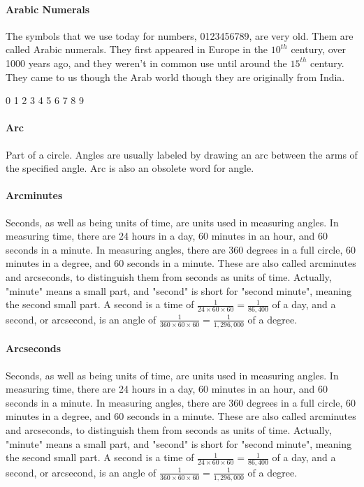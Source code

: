 \documentclass[12pt]{article}
\begin{document}
\paragraph{Arabic Numerals}
The symbols that we use today for numbers, 0123456789, are very old. Them are called Arabic numerals. They first appeared in Europe in the $10^{th}$ century, over 1000 years ago, and they weren't in common use until around the $15^{th}$ century. They came to us though the Arab world though they are originally from India.
\begin{center}
{\Huge 0 1 2 3 4 5 6 7 8 9}
\end{center}

\paragraph{Arc} Part of a circle. Angles are usually labeled by drawing an arc between the arms of the specified angle. Arc is also an obsolete word for angle.

\begin{center}
\end{center}

\paragraph{Arcminutes}
Seconds, as well as being units of time, are units used in  measuring angles. In measuring time, there are 24 hours in a day, 60 minutes in an hour, and 60 seconds in a minute. In measuring angles, there are 360 degrees in a full circle, 60 minutes in a degree, and 60 seconds in a minute. These are also called arcminutes and arcseconds, to distinguish them from seconds as units of time. Actually, "minute" means a small part, and "second" is short for "second minute", meaning the second small part. A second is a time of $\frac{1}{24\times60\times60} = \frac{1}{86,400}$ of a day, and a second, or arcsecond, is an angle of $\frac{1}{360\times60\times60}=\frac{1}{1,296,000}$ of a degree.

\paragraph{Arcseconds}
Seconds, as well as being units of time, are units used in  measuring angles. In measuring time, there are 24 hours in a day, 60 minutes in an hour, and 60 seconds in a minute. In measuring angles, there are 360 degrees in a full circle, 60 minutes in a degree, and 60 seconds in a minute. These are also called arcminutes and arcseconds, to distinguish them from seconds as units of time. Actually, "minute" means a small part, and "second" is short for "second minute", meaning the second small part. A second is a time of $\frac{1}{24\times60\times60} = \frac{1}{86,400}$ of a day, and a second, or arcsecond, is an angle of $\frac{1}{360\times60\times60}=\frac{1}{1,296,000}$ of a degree.
\end{document}
